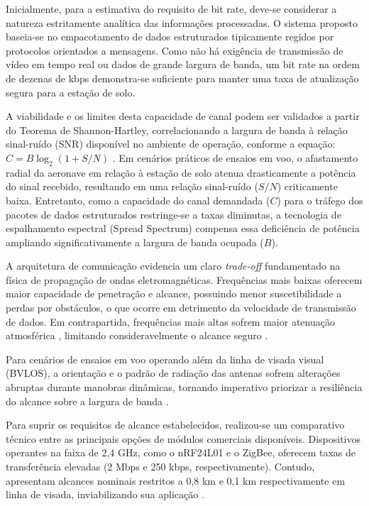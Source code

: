 Inicialmente, para a estimativa do requisito de bit rate, deve-se considerar a natureza estritamente analítica das informações processadas. O sistema proposto baseia-se no empacotamento de dados estruturados tipicamente regidos por protocolos orientados a mensagens. Como não há exigência de transmissão de vídeo em tempo real ou dados de grande largura de banda, um bit rate na ordem de dezenas de kbps demonstra-se suficiente para manter uma taxa de atualização segura para a estação de solo. 

A viabilidade e os limites desta capacidade de canal podem ser validados a partir do Teorema de Shannon-Hartley, correlacionando a largura de banda à relação sinal-ruído (SNR) disponível no ambiente de operação, conforme a equação: $C = B \log_2(1 + S/N)$ \cite{haykin_communication}. Em cenários práticos de ensaios em voo, o afastamento radial da aeronave em relação à estação de solo atenua drasticamente a potência do sinal recebido, resultando em uma relação sinal-ruído ($S/N$) criticamente baixa. Entretanto, como a capacidade do canal demandada ($C$) para o tráfego dos pacotes de dados estruturados restringe-se a taxas diminutas, a tecnologia de espalhamento espectral (Spread Spectrum) compensa essa deficiência de potência ampliando significativamente a largura de banda ocupada ($B$).

A arquitetura de comunicação evidencia um claro \textit{trade-off} fundamentado na física de propagação de ondas eletromagnéticas. Frequências mais baixas oferecem maior capacidade de penetração e alcance, possuindo menor suscetibilidade a perdas por obstáculos, o que ocorre em detrimento da velocidade de transmissão de dados. Em contrapartida, frequências mais altas sofrem maior atenuação atmosférica , limitando consideravelmente o alcance seguro \cite{haykin_communication}. 

Para cenários de ensaios em voo operando além da linha de visada visual (BVLOS), a orientação e o padrão de radiação das antenas sofrem alterações abruptas durante manobras dinâmicas, tornando imperativo priorizar a resiliência do alcance sobre a largura de banda \cite{microwave_engineering}.

Para suprir os requisitos de alcance estabelecidos, realizou-se um comparativo técnico entre as principais opções de módulos comerciais disponíveis. Dispositivos operantes na faixa de 2,4 GHz, como o nRF24L01 e o ZigBee, oferecem taxas de transferência elevadas (2 Mbps e 250 kbps, respectivamente). Contudo, apresentam alcances nominais restritos a 0,8 km e 0,1 km respectivamente em linha de visada, inviabilizando sua aplicação \cite{nrf24l01_datasheet} \cite{zigbee_datasheet}. 

